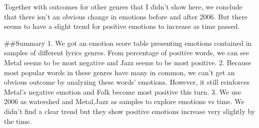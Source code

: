 \documentclass[]{article}
\begin{document}
Together with outcomes for other genres that I didn't show here, we
conclude that there isn't an obvious change in emotions before and after
2006. But there seems to have a slight trend for positive emotions to
increase as time passed.

\#\#Summary 1. We got an emotion score table presenting emotions
contained in samples of different lyrics genres. From percentage of
positive words, we can see Metal seems to be most negative and Jazz
seems to be most positive. 2. Because most popular words in these genres
have many in common, we can't get an obvious outcome by analyzing these
words' emotions. However, it still reinforces Metal's negative emotion
and Folk become most positive this turn. 3. We use 2006 as watershed and
Metal,Jazz as samples to explore emotions vs time. We didn't find a
clear trend but they show positive emotions increase very slightly by
the time.
\end{document}
